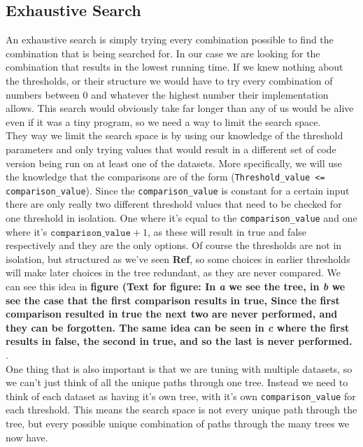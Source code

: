 \subsection{Exhaustive Search}
An exhaustive search is simply trying every combination possible to find the
combination that is being searched for. In our case we are looking for the
combination that results in the lowest running time. If we knew nothing about
the thresholds, or their structure we would have to try every combination of
numbers between 0 and whatever the highest number their implementation allows.
This search would obviously take far longer than any of us would be alive even
if it was a tiny program, so we need a way to limit the search space.
\\
They way we limit the search space is by using our knowledge of the threshold
parameters and only trying values that would result in a different set of code 
version being run on at least one of the datasets. More specifically, we will
use the knowledge that the comparisons are of the form
(\texttt{Threshold\_value <= comparison\_value}). Since the
\texttt{comparison\_value} is constant for a certain input there are only
really two different threshold values that need to be checked for one threshold 
in isolation. One where it's equal to the \texttt{comparison\_value} and one
where it's $\texttt{comparison\_value} + 1$, as these will result in true and
false respectively and they are the only options.
Of course the thresholds are not in isolation, but structured as we've seen
\textbf{Ref}, so some choices in earlier thresholds will make later choices in
the tree redundant, as they are never compared. We can see this idea in
\textbf{figure (Text for figure: In \textit{a} we see the tree, in \textit{b} 
  we see
  the case that the first comparison results in true, Since the first
  comparison resulted in true the next two are never performed, and they can be
  forgotten. The same idea can be seen in \textit{c} where the first results in
  false, the second in true, and so the last is never performed.
}.
\\
One thing that is also important is that we are tuning with multiple datasets,
so we can't just think of all the unique paths through one tree. Instead we
need to think of each dataset as having it's own tree, with it's own 
\texttt{comparison\_value} for each threshold. This means the search space is
not every unique path through the tree, but every possible unique combination
of paths through the many trees we now have. 

